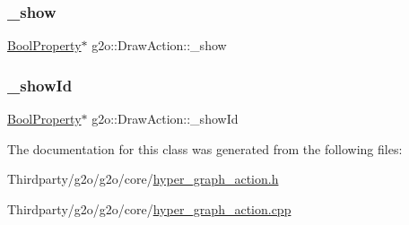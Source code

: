 \subsubsection{\texorpdfstring{\+\_\+show}{\_show}}
{\footnotesize\ttfamily \mbox{\hyperlink{namespaceg2o_a28e624fedcafeb2b049be2930421071f}{Bool\+Property}}$\ast$ g2o\+::\+Draw\+Action\+::\+\_\+show\hspace{0.3cm}{\ttfamily [protected]}}

\mbox{\label{classg2o_1_1_draw_action_ab5f870bf2a931e64bc994c87c4212ad3}} 
\subsubsection{\texorpdfstring{\+\_\+show\+Id}{\_showId}}
{\footnotesize\ttfamily \mbox{\hyperlink{namespaceg2o_a28e624fedcafeb2b049be2930421071f}{Bool\+Property}}$\ast$ g2o\+::\+Draw\+Action\+::\+\_\+show\+Id\hspace{0.3cm}{\ttfamily [protected]}}



The documentation for this class was generated from the following files\+:\begin{DoxyCompactItemize}
\item 
Thirdparty/g2o/g2o/core/\mbox{\hyperlink{hyper__graph__action_8h}{hyper\+\_\+graph\+\_\+action.\+h}}\item 
Thirdparty/g2o/g2o/core/\mbox{\hyperlink{hyper__graph__action_8cpp}{hyper\+\_\+graph\+\_\+action.\+cpp}}\end{DoxyCompactItemize}
